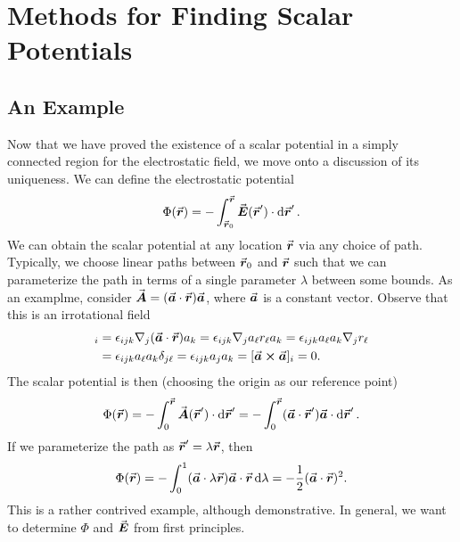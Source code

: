 \chapter{Methods for Finding Scalar Potentials}

\section{An Example}

Now that we have proved the existence of a scalar potential in a simply connected region for the electrostatic field, we move onto a discussion of its uniqueness.
We can define the electrostatic potential
\begin{eqnarray}
    \Phi(\va*{r}) = -\int_{\va*{r}_{0}}^{\va*{r}} \va*{E}(\va*{r}') \cdot \dd{\va*{r}'}
.\end{eqnarray}
We can obtain the scalar potential at any location $\va*{r}$ via any choice of path.
Typically, we choose linear paths between $\va*{r}_{0}$ and $\va*{r}$ such that we can parameterize the path in terms of a single parameter $\lambda$ between some bounds.
As an examplme, consider $\va*{A} = (\va*{a} \cdot \va*{r}) \va*{a}$, where $\va*{a}$ is a constant vector.
Observe that this is an irrotational field
\begin{align}
    [\curl{\va*{A}}]_{i} &= \epsilon_{ijk} \nabla_{j} (\va*{a} \cdot \va*{r}) a_{k} = \epsilon_{ijk} \nabla_{j} a_{\ell} r_{\ell} a_{k} = \epsilon_{ijk} a_{\ell} a_{k} \nabla_{j} r_{\ell} \nonumber \\
                         &= \epsilon_{ijk} a_{\ell} a_{k} \delta_{j \ell} = \epsilon_{ijk} a_{j} a_{k} = [\va*{a} \cross \va*{a}]_{i} = 0
.\end{align}
The scalar potential is then (choosing the origin as our reference point)
\begin{eqnarray}
    \Phi(\va*{r}) = - \int_{0}^{\va*{r}} \va*{A}(\va*{r}') \cdot \dd{\va*{r}'} = - \int_{0}^{\va*{r}} (\va*{a} \cdot \va*{r}') \va*{a} \cdot \dd{\va*{r}'} 
.\end{eqnarray}
If we parameterize the path as $\va*{r}' = \lambda \va*{r}$, then
\begin{eqnarray}
    \Phi(\va*{r}) = - \int_{0}^{1} (\va*{a} \cdot \lambda \va*{r})\va*{a} \cdot \va*{r} \dd{\lambda} = -\frac{1}{2} (\va*{a} \cdot \va*{r})^2
.\end{eqnarray}
This is a rather contrived example, although demonstrative.
In general, we want to determine $\Phi$ and $\va*{E}$ from first principles.

